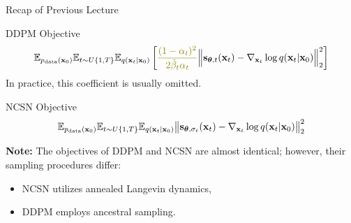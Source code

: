 \documentclass{beamer}
\begin{document}
\begin{frame}
\titlepage
	\resetonslide
\end{frame}
\begin{frame}{Recap of Previous Lecture}
	\begin{block}{DDPM Objective}
		\vspace{-0.5cm}
		\[
			\bbE_{\pd(\bx_0)} \bbE_{t \sim U\{1, T\}}\bbE_{q(\bx_t | \bx_0)} \left[ {\color{olive}\frac{(1 - \alpha_t)^2}{2\tilde{\beta}_t \alpha_t}} \Bigl\|  \bs_{\btheta, t} (\bx_t) - \nabla_{\bx_t} \log q(\bx_t | \bx_0) \Bigr\|_2^2  \right]
		\]
		In practice, {\color{olive}this coefficient} is usually omitted.
	\end{block}
	\begin{block}{NCSN Objective}
		\vspace{-0.3cm}
		\[
			\mathbb{E}_{p_{\text{data}}(\mathbf{x}_0)} \mathbb{E}_{t \sim U\{1, T\}} \mathbb{E}_{q(\mathbf{x}_t | \mathbf{x}_0)}\bigl\| \mathbf{s}_{\boldsymbol{\theta}, \sigma_t}(\mathbf{x}_t) - \nabla_{\mathbf{x}_t} \log q(\mathbf{x}_t | \mathbf{x}_0) \bigr\|^2_2 
		\]
		\vspace{-0.3cm}
	\end{block}
	\textbf{Note:} The objectives of DDPM and NCSN are almost identical; however, their sampling procedures differ:
	\begin{itemize}
		\item NCSN utilizes annealed Langevin dynamics,
		\item DDPM employs ancestral sampling.
	\end{itemize}
\end{frame}
\end{document}
